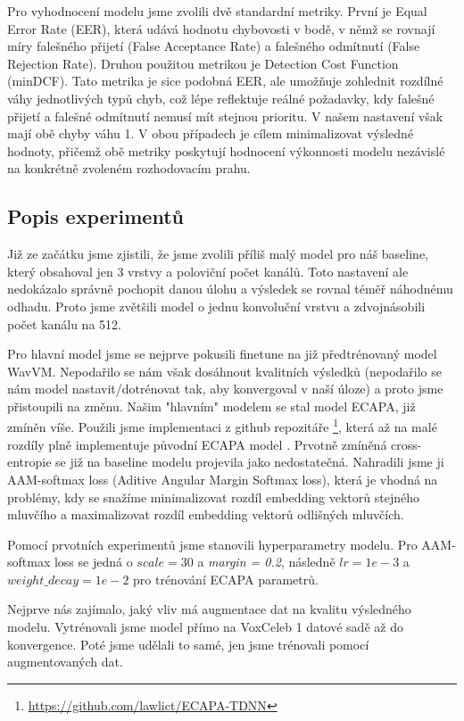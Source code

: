 \documentclass{article}
\begin{document}
Pro vyhodnocení modelu jsme zvolili dvě standardní metriky. První je Equal Error Rate (EER), která udává hodnotu chybovosti v bodě, v němž se rovnají míry falešného přijetí (False Acceptance Rate) a falešného odmítnutí (False Rejection Rate). Druhou použitou metrikou je Detection Cost Function (minDCF). Tato metrika je sice podobná EER, ale umožňuje zohlednit rozdílné váhy jednotlivých typů chyb, což lépe reflektuje reálné požadavky, kdy falešné přijetí a falešné odmítnutí nemusí mít stejnou prioritu. V našem nastavení však mají obě chyby váhu 1. V obou případech je cílem minimalizovat výsledné hodnoty, přičemž obě metriky poskytují hodnocení výkonnosti modelu nezávislé na konkrétně zvoleném rozhodovacím prahu.

\subsection{Popis experimentů}

Již ze začátku jsme zjistili, že jsme zvolili příliš malý model pro náš baseline, který obsahoval jen 3 vrstvy a poloviční počet kanálů. Toto nastavení ale nedokázalo správně pochopit danou úlohu a výsledek se rovnal téměř náhodnému odhadu. Proto jsme zvětšili model o jednu konvoluční vrstvu a zdvojnásobili počet kanálu na 512.

Pro hlavní model jsme se nejprve pokusili finetune na již předtrénovaný model WavVM. Nepodařilo se nám však dosáhnout kvalitních výsledků (nepodařilo se nám model nastavit/dotrénovat tak, aby konvergoval v naší úloze) a proto jsme přistoupili na změnu. Našim "hlavním" modelem se stal model ECAPA, již zmíněn víše. Použili jsme implementaci z github repozitáře \footnote{\href{https://github.com/lawlict/ECAPA-TDNN}{https://github.com/lawlict/ECAPA-TDNN}}, která až na malé rozdíly plně implementuje původní ECAPA model \cite{ECAPA}. 
Prvotně zmíněná cross-entropie se již na baseline modelu projevila jako nedostatečná. Nahradili jsme ji AAM-softmax loss (Aditive Angular Margin Softmax loss), která je vhodná na problémy, kdy se snažíme minimalizovat rozdíl embedding vektorů stejného mluvčího a maximalizovat rozdíl embedding vektorů odlišných mluvčích.

Pomocí prvotních experimentů jsme stanovili hyperparametry modelu. Pro AAM-softmax loss se jedná o \textit{$scale = 30$} a \textit{margin = 0.2}, následně \textit{$lr=1e-3$} a \textit{$weight\_decay=1e-2$} pro trénování ECAPA parametrů.   

Nejprve nás zajímalo, jaký vliv má augmentace dat na kvalitu výsledného modelu. Vytrénovali jsme model přímo na VoxCeleb 1 datové sadě až do konvergence. Poté jsme udělali to samé, jen jsme trénovali pomocí augmentovaných dat. 
\end{document}
